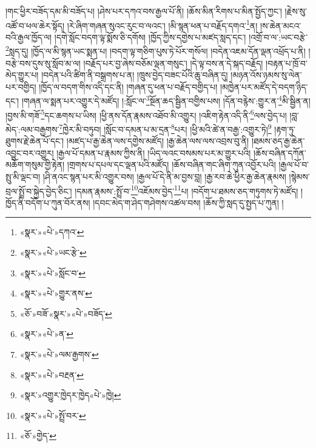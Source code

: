 \documentclass[12pt,a4paper]{book}
\begin{document}
།གང་ཕྱིར་བཟོད་དམ་མི་བཟོད་པ། །ཤེས་པར་དཀའ་བས་རྒྱལ་པོ་ནི། །ཆོས་མིན་རིགས་པ་མིན་སྤྱོད་ཀྱང་། །རྗེས་སུ་འཚོ་བ་ཕལ་ཆེར་སྟོད། །རེ་ཞིག་གཞན་སུའང་རུང་བ་ལའང་། །མི་སྙན་ཕན་པ་བརྗོད་དགའ་\footnote{«སྣར་»«པེ་»དཀའ་}ན། །ས་ཆེན་མངའ་བའི་རྒྱལ་ཁྱོད་ལ། །དགེ་སློང་བདག་ལྟ་སྨོས་ཅི་དགོས། །ཁྱོད་ཀྱིས་དགྱེས་པ་མཛད་སླད་དང་། །འགྲོ་བ་ལ་:ཡང་བརྩེ་\footnote{«སྣར་»«པེ་»ཡང་རྩེ་}སླད་དུ། །ཁྱོད་ལ་མི་སྙན་ཡང་སྨན་པ། །བདག་ལྟ་གཅིག་པུས་ཏེ་པོར་གསོལ། །བདེན་འཇམ་དོན་ལྡན་འཕྲོད་པ་ནི། །བརྩེ་བས་དུས་སུ་སློབ་མ་ལ། །བརྗོད་པར་བྱ་ཞེས་བཅོམ་ལྡན་གསུང་། །དེ་ལྟ་བས་ན་དེ་སྐད་བརྗོད། །བརྟན་པ་ཁྲོ་བ་མེད་གྱུར་པ། །བདེན་པའི་ཚིག་ནི་བསྒྲགས་པ་ན། །ཁྲུས་བྱེད་བཟང་པོའི་ཆུ་བཞིན་དུ། །མཉན་འོས་ཉམས་སུ་ལེན་པར་བགྱིད། །ཁྱོད་ལ་བདག་གིས་འདི་དང་ནི། །གཞན་དུ་ཕན་པ་བརྗོད་བགྱིད་པ། །མཁྱེན་པར་མཛོད་དེ་བདག་ཉིད་དང་། །གཞན་ལ་སྨན་པར་འགྱུར་དེ་མཛོད། །:སློང་ལ་\footnote{«སྣར་»«པེ་»སློང་བ་}སྔོན་ཆད་སྦྱིན་བགྱིས་པས། །དོན་བརྙེས་:གྱུར་ན་\footnote{«སྣར་»«པེ་»གྱུར་ནས་}མི་སྦྱིན་ན། །བྱས་མི་གཟོ་\footnote{«ཅོ་»བཟོ་«སྣར་»«པེ་»བཟོད་}དང་ཆགས་པ་ཡིས། །ཕྱི་ནས་དོན་རྣམས་འཐོབ་མི་འགྱུར། །འཇིག་རྟེན་འདི་ནི་\footnote{«སྣར་»«པེ་»ན་}ལས་བྱེད་པ། །བླ་མེད་:ལམ་བརྒྱགས་\footnote{«སྣར་»«པེ་»ལམ་རྒྱགས་}ཁྱེར་མི་བཏུབ། །སློང་བ་དམན་པ་མ་དྲན་\footnote{«སྣར་»«པེ་»བརྔན་}པར། །ཕྱི་མའི་ཚེ་ན་བརྒྱ་:འགྱུར་ཏེ།\footnote{«སྣར་»འགྱུར་ཁྱེདར་ཁྱེད«པེ་»ཁྱེ།} །རྟག་ཏུ་ཐུགས་རྗེ་ཆེན་པོ་དང་། །མཛད་པ་རྒྱ་ཆེན་ལས་དགྱེས་མཛོད། །རྒྱ་ཆེན་ལས་ལས་འབྲས་བུ་ནི། །ཐམས་ཅད་རྒྱ་ཆེན་འབྱུང་བར་འགྱུར། །རྒྱལ་པོ་དམན་པ་རྣམས་ཀྱིས་ནི། །ཡིད་ལའང་བསམས་པར་མ་གྱུར་པའི། །ཆོས་བཞིན་དཀོན་མཆོག་གསུམ་གྱི་རྟེན། །གྲགས་པ་དཔལ་དང་ལྡན་པའི་མཛོད། །ཆོས་བཞིན་གང་ཞིག་ཀུན་འབྱོར་པའི། །རྒྱལ་པོ་བ་སྤུ་མི་ལྡང་བ། །ཤི་ནའང་སྙན་པར་མི་འགྱུར་བས། །རྒྱལ་པོ་དེ་ནི་མ་བྱས་བླ། །རྒྱ་རབ་ཆེ་ཕྱིར་རྒྱ་ཆེན་རྣམས། །སྙེམས་བྲལ་སྤྲོ་བ་སྐྱེད་བྱེད་ཅིང་། །དམན་རྣམས་:སྤྲོ་བ་\footnote{«སྣར་»«པེ་»སྤྲོ་བར་}འཇོམས་བྱེད་\footnote{«ཅོ་»གྱེད་}པ། །བདོག་པ་ཐམས་ཅད་གཏུགས་ཏེ་མཛོད། །ཁྱོད་ནི་བདོག་པ་ཀུན་བོར་ནས། །དབང་མེད་ག་ཤེད་གཤེགས་འཚལ་བས། །ཆོས་ཀྱི་སླད་དུ་སྤྱད་པ་ཀུན། །
\end{document}
